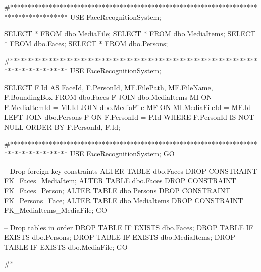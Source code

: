 #****************************************************************************************
USE FaceRecognitionSystem;

SELECT * FROM dbo.MediaFile;
SELECT * FROM dbo.MediaItems;
SELECT * FROM dbo.Faces;
SELECT * FROM dbo.Persons;



#****************************************************************************************
USE FaceRecognitionSystem;

SELECT 
    F.Id AS FaceId,
    F.PersonId,
    MF.FilePath,
    MF.FileName,
    F.BoundingBox
FROM dbo.Faces F
JOIN dbo.MediaItems MI ON F.MediaItemId = MI.Id
JOIN dbo.MediaFile MF ON MI.MediaFileId = MF.Id
LEFT JOIN dbo.Persons P ON F.PersonId = P.Id
WHERE F.PersonId IS NOT NULL
ORDER BY F.PersonId, F.Id;


#****************************************************************************************
USE FaceRecognitionSystem;
GO

-- Drop foreign key constraints
ALTER TABLE dbo.Faces DROP CONSTRAINT FK_Faces_MediaItem;
ALTER TABLE dbo.Faces DROP CONSTRAINT FK_Faces_Person;
ALTER TABLE dbo.Persons DROP CONSTRAINT FK_Persons_Face;
ALTER TABLE dbo.MediaItems DROP CONSTRAINT FK_MediaItems_MediaFile;
GO

-- Drop tables in order
DROP TABLE IF EXISTS dbo.Faces;
DROP TABLE IF EXISTS dbo.Persons;
DROP TABLE IF EXISTS dbo.MediaItems;
DROP TABLE IF EXISTS dbo.MediaFile;
GO



#*